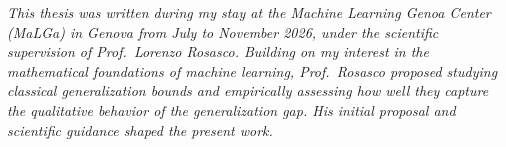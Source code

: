 \emph{This thesis was written during my stay at the Machine Learning Genoa Center (MaLGa) in Genova from July to November 2026, under the scientific supervision of Prof.\ Lorenzo Rosasco. Building on my interest in the mathematical foundations of machine learning, Prof.\ Rosasco proposed studying classical generalization bounds and empirically assessing how well they capture the qualitative behavior of the generalization gap. His initial proposal and scientific guidance shaped the present work.}

